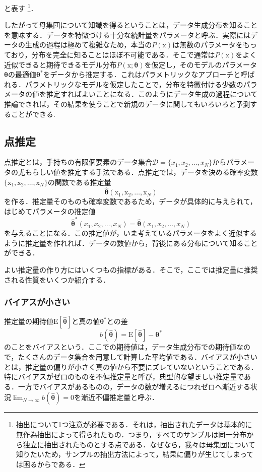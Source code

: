 \documentclass[a4paper,11pt]{jsreport}
\begin{document}
と表す
\footnote{抽出について1つ注意が必要である．それは，抽出されたデータは基本的に無作為抽出によって得られたもの．つまり，すべてのサンプルは同一分布から独立に抽出されたものとする点である．なぜなら，我々は母集団について知りたいため，サンプルの抽出方法によって，結果に偏りが生じてしまっては困るからである．}．\par
したがって母集団について知識を得るということは，データ生成分布を知ることを意味する．データを特徴づける十分な統計量をパラメータと呼ぶ．実際にはデータの生成の過程は極めて複雑なため，本当の$P(\mathrm{x})$は無数のパラメータをもっており，分布を完全に知ることはほぼ不可能である．そこで通常は$P(\mathrm{x})$をよく近似できると期待できるモデル分布$P(\mathrm{x};\bm{\theta})$を仮定し，そのモデルのパラメータ$\bm{\theta}$の最適値$\bm{\theta}^*$をデータから推定する．これはパラメトリックなアプローチと呼ばれる．パラメトリックなモデルを仮定したことで，分布を特徴付ける少数のパラメータの値を推定すればよいことになる．このようにデータ生成の過程について推論できれば，その結果を使うことで新規のデータに関してもいろいろと予測することができる.
\subsection{点推定}
点推定とは，手持ちの有限個要素のデータ集合$\mathcal{D} = \{ x_1, x_2,\dots, x_N \}$からパラメータの尤もらしい値を推定する手法である．点推定では，データを決める確率変数$\{ \mathrm{x}_1, \mathrm{x}_2, \dots, \mathrm{x}_N \}$の関数である推定量
\begin{equation}
  \hat{\bm{\theta}}( \mathrm{x}_1, \mathrm{x}_2, \dots, \mathrm{x}_N )
\end{equation}
を作る．推定量そのものも確率変数であるため，データが具体的に与えられて，はじめてパラメータの推定値
\begin{equation}
  \hat{\bm{\theta}}^*( x_1, x_2, \dots, x_N )
  =\hat{\bm{\theta}}( x_1, x_2, \dots, x_N )
\end{equation}
を与えることになる．この推定値が，いま考えているパラメータをよく近似するように推定量を作れれば．データの数値から，背後にある分布について知ることができる．\par
よい推定量の作り方にはいくつもの指標がある．そこで，ここでは推定量に推奨される性質をいくつか紹介する．

\subsubsection*{バイアスが小さい}
推定量の期待値$\mathrm{E} \left[ \hat{\bm{\theta}} \right]$と真の値$\bm{\theta}^*$との差
\begin{equation}
  b(\hat{\bm{\theta}})
  = \mathrm{E} \left[ \hat{\bm{\theta}} \right] - \bm{\theta}^*
\end{equation}
のことをバイアスという．ここでの期待値は，データ生成分布での期待値なので，たくさんのデータ集合を用意して計算した平均値である．バイアスが小さいとは，推定量の偏りが小さく真の値から不要にズレていないということである．特にバイアスがゼロのものを不偏推定量と呼び，典型的な望ましい推定量である．一方でバイアスがあるものの，データの数が増えるにつれゼロへ漸近する状況$\lim_{N \rightarrow \infty} b(\hat{\bm{\theta}}) = 0$を漸近不偏推定量と呼ぶ．
\end{document}
